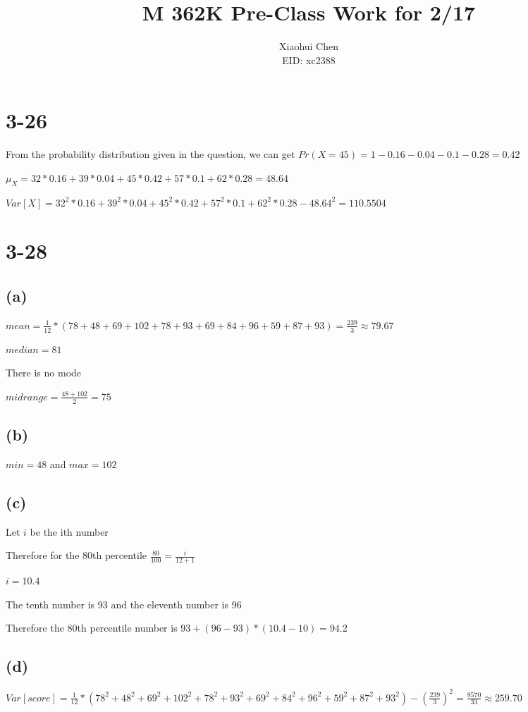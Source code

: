 \documentclass[12pt]{article}
\author{Xiaohui Chen \\EID: xc2388}
\title{M 362K Pre-Class Work for 2/17}
\begin{document}
\maketitle
\begin{spacing}{2.0}

\section*{3-26}
From the probability distribution given in the question, we can get $Pr(X=45)=1-0.16-0.04-0.1-0.28=0.42$

$\mu_X= 32*0.16+ 39*0.04 +45*0.42+ 57*0.1 + 62*0.28= 48.64$

$Var[X]= 32^2*0.16+ 39^2*0.04 +45^2*0.42+ 57^2*0.1 + 62^2*0.28- 48.64^2= 110.5504$

\section*{3-28}

\subsection*{(a)}
$mean=\frac{1}{12}*(78+48+69+102+78+93+69+84+96+59+87+93)= \frac{239}{3} \approx 79.67$

$median= 81$

There is no mode

$midrange=\frac{48+102}{2}=75$

\subsection*{(b)}
$min=48$ and $max=102$

\subsection*{(c)}
Let $i$ be the ith number

Therefore for the 80th percentile $\frac{80}{100}= \frac{i}{12+1}$

$i=10.4$

The tenth number is 93 and the eleventh number is 96

Therefore the 80th percentile number is $93+(96-93)* (10.4-10)=94.2$

\subsection*{(d)}
$Var[score]= \frac{1}{12}* (78^2+48^2+69^2+102^2+78^2+93^2+69^2+84^2+96^2+59^2+87^2+93^2) - \left( \frac{239}{3} \right)^2= \frac{8570}{33} \approx 259.70$


\end{spacing}
\end{document}
